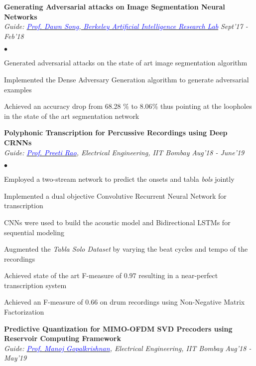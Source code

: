 \documentclass[margin,line, 9pt]{res}
\newenvironment{list2}{
  \begin{list}{$\bullet$}{%
      \setlength{\itemsep}{0.03in}
      \setlength{\parsep}{0in} \setlength{\parskip}{0in}
      \setlength{\topsep}{0in} \setlength{\partopsep}{0in} 
      \setlength{\leftmargin}{0.2in}}}{\end{list}}
\begin{document}
\begin{resume}
% 
{\bf Generating Adversarial attacks on Image Segmentation Neural Networks} \\
{\em Guide: \href{https://people.eecs.berkeley.edu/~dawnsong/}{\textcolor{blue}{Prof. Dawn Song}},\href{https://bair.berkeley.edu}{\textcolor{blue}{ Berkeley Artificial Intelligence Research Lab}}} \hfill {\it Sept'17 - Feb'18}\\
\vspace*{-.13in}
\begin{list2}
\item Generated adversarial attacks on the state of art image segmentation algorithm
\item Implemented the Dense Adversary Generation algorithm to generate adversarial examples
\item Achieved an accuracy drop from 68.28 $\%$ to 8.06$\%$ thus pointing at the loopholes in the state of the art segmentation network
\end{list2}
% 
% 
% 
% 
{\bf Polyphonic Transcription for Percussive Recordings using Deep CRNNs} \\
{\em Guide: \href{https://www.ee.iitb.ac.in/wiki/faculty/prao}{\textcolor{blue}{Prof. Preeti Rao}}, Electrical Engineering, IIT Bombay} \hfill {\it Aug'18 - June'19}\\
\vspace*{-.13in}
\begin{list2}
\item Employed a two-stream network to predict the onsets and tabla \textit{bols} jointly
\item Implemented a dual objective Convolutive Recurrent Neural Network for transcription
\item CNNs were used to build the acoustic model and Bidirectional LSTMs for sequential modeling
\item Augmented the \textit{Tabla Solo Dataset} by varying the beat cycles and tempo of the recordings
\item Achieved state of the art F-measure of $0.97$ resulting in a near-perfect transcription system
\item Achieved an F-measure of $0.66$ on drum recordings using Non-Negative Matrix Factorization
\end{list2}
% 
% 
% 
% 
% 
{\bf Predictive Quantization for MIMO-OFDM SVD Precoders using Reservoir Computing Framework} \\
{\em Guide: \href{https://www.ee.iitb.ac.in/web/people/faculty/home/manojg}{\textcolor{blue}{Prof. Manoj Gopalkrishnan}}, Electrical Engineering, IIT Bombay} \hfill {\it Aug'18 - May'19}\\

\end{resume}
\end{document}
